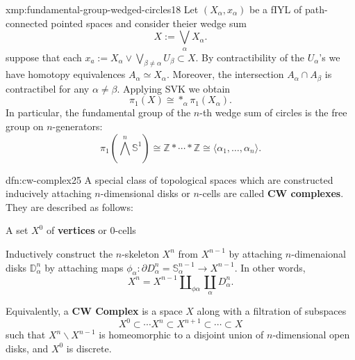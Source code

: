 \documentclass[landscape, 8pt]{extarticle}
\begin{document}
\begin{multicols*}{3}
\begin{xmp}{xmp:fundamental-group-wedged-circles}{18}
	Let $(X_{\alpha}, x_{\alpha})$ be a fIYL of path-connected pointed spaces and consider theier wedge sum
	\[X := \bigvee_{\alpha} X_{\alpha}.\]
	suppose that each $x_{a}:= X_{\alpha} \vee \bigvee_{\beta \ne \alpha} U_{\beta} \subset X$.
	By contractibility of the $U_{\alpha}$'s we have homotopy equivalences $A_{\alpha} \simeq X_{\alpha}$. Moreover, the intersection $A_{\alpha} \cap A_{\beta}$ is contractibel for any $\alpha\ne \beta$. Applying SVK we obtain
	\[\pi_{1}(X) \cong \ast_{\alpha} \pi_{1}(X_{\alpha}).\]
	In particular, the fundamental group of the $n$-th wedge sum of circles is the free group on $n$-generators:
	\setcounter{equation}{22}
	\begin{equation}
		\pi_{1}\left(\bigwedge^{n} \mathbb{S}^{1}\right) \cong \mathbb{Z} \ast \cdots \ast \mathbb{Z} \cong \langle  \alpha_{1},\dots, \alpha_{n} \rangle.
	\end{equation}
\end{xmp}

\columnbreak

\begin{dfn}[CW Complexes]{dfn:cw-complex}{25}
	A special class of topological spaces which are constructed inducively attaching $n$-dimensional disks or $n$-cells are called \textbf{CW complexes}. They are described as follows:
	\begin{enumerate-zero}
	    \item A set $X^{0}$ of \textbf{vertices} or $0$-cells
	    \item Inductively construct the $n$-skeleton $X^{n}$ from $X^{n-1}$ by attaching $n$-dimenaional disks $\mathbb{D}^{n}_{\alpha}$ by attaching maps $\phi_{\alpha} : \partial D^{n}_{\alpha} = \mathbb{S}_{\alpha}^{n-1}\to X^{n-1}$. In other words,
			\[X^{n} = X^{n-1} \amalg_{\phi\alpha} \coprod_{\alpha} D^{n}_{\alpha}.\]
	\end{enumerate-zero}
	Equivalently, a \textbf{CW Complex} is a space $X$ along with a filtration of subspaces
	\[X^{0} \subset \cdots X^{n} \subset X^{n+1} \subset \cdots \subset X\]
	such that $X^{n} \backslash X^{n-1}$ is homeomorphic to a disjoint union of $n$-dimensional open disks, and $X^{0}$ is discrete.
\end{dfn}


\end{multicols*}
\end{document}
